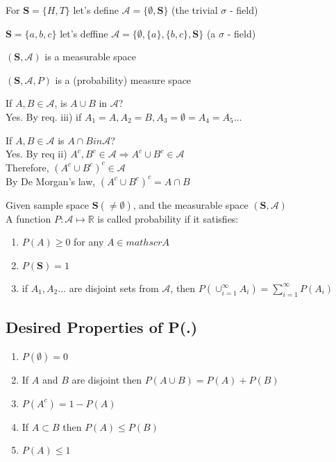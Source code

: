\documentclass[12pt, oneside, letterpaper]{notes}
\begin{document}
\begin{myex}
	For $\textbf{S} = \{H,T\}$ let's define $\mathscr{A} 
	= \{\emptyset, \textbf{S}\}$  (the trivial $\sigma$ - field)
\end{myex}

\begin{myex}
	$\textbf{S} = \{a, b, c\}$ let's deffine $\mathscr{A} 
	= \{\emptyset, \{a\}, \{b, c\}, \textbf{S} \}$ (a $\sigma$ - field) 
\end{myex}

\begin{mydef}
	$(\textbf{S}, \mathscr{A})$ is a measurable space
\end{mydef}

\begin{mydef}
	$(\textbf{S}, \mathscr{A}, P)$ is a (probability) measure space
\end{mydef}

\begin{myex}
	If $A, B \in \mathscr{A}$, is $A \cup B$ in $\mathscr{A}$? \\
	Yes.  By req. iii) if $A_1 = A, A_2 = B, A_3 = \emptyset = A_4 = A_5 ...$
\end{myex}

\begin{myex}
	If $A, B \in \mathscr{A}$ is $A \cap B in \mathscr{A}$? \\
	Yes.  By req ii) $A^c, B^c \in \mathscr{A} \Rightarrow 
	A^c \cup B^c \in \mathscr{A}$ \\
	Therefore, $(A^c \cup B^c)^c \in \mathscr{A}$ \\
	By De Morgan's law, $(A^c \cup B^c)^c = A \cap B$
\end{myex}	

\begin{mydef}
	Given sample space $\textbf{S} (\neq \emptyset)$, and the 
	measurable space $(\textbf{S}, \mathscr{A})$ \\
	A function $P: \mathscr{A} \mapsto \mathbb{R}$ is called 
	probability if it satisfies:
	\begin{enumerate}
		\item $P(A) \geq 0$ for any $A \in mathscr{A}$
		\item $P(\textbf{S}) = 1$
		\item if $A_1, A_2 ...$ are disjoint sets from $\mathscr{A}$,
		then $P(\cup_{i=1}^{\infty} A_i) = \sum_{i=1}^{\infty} P(A_i)$
	\end{enumerate}
\end{mydef}

\subsection*{Desired Properties of P(.)}
\begin{enumerate}
	\item $P(\emptyset) = 0$
	\item If $A$ and $B$ are disjoint then $P(A \cup B) = P(A) + P(B)$
	\item $P(A^c) = 1- P(A)$
	\item If $A \subset B$ then $P(A) \leq P(B)$
	\item $P(A) \leq 1$
\end{enumerate}
\end{document}
